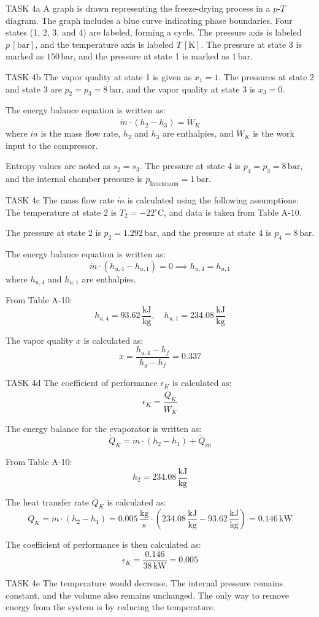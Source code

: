 TASK 4a  
A graph is drawn representing the freeze-drying process in a \( p \)-\( T \) diagram. The graph includes a blue curve indicating phase boundaries. Four states (1, 2, 3, and 4) are labeled, forming a cycle. The pressure axis is labeled \( p \, [\text{bar}] \), and the temperature axis is labeled \( T \, [\text{K}] \). The pressure at state 3 is marked as \( 150 \, \text{bar} \), and the pressure at state 1 is marked as \( 1 \, \text{bar} \).  

TASK 4b  
The vapor quality at state 1 is given as \( x_1 = 1 \).  
The pressures at state 2 and state 3 are \( p_2 = p_3 = 8 \, \text{bar} \), and the vapor quality at state 3 is \( x_3 = 0 \).  

The energy balance equation is written as:  
\[
\dot{m} \cdot (h_2 - h_3) = \dot{W}_K
\]  
where \( \dot{m} \) is the mass flow rate, \( h_2 \) and \( h_3 \) are enthalpies, and \( \dot{W}_K \) is the work input to the compressor.  

Entropy values are noted as \( s_2 = s_3 \).  
The pressure at state 4 is \( p_4 = p_3 = 8 \, \text{bar} \), and the internal chamber pressure is \( p_{\text{Innenraum}} = 1 \, \text{bar} \).  

TASK 4c  
The mass flow rate \( \dot{m} \) is calculated using the following assumptions:  
The temperature at state 2 is \( T_2 = -22^\circ\text{C} \), and data is taken from Table A-10.  

The pressure at state 2 is \( p_2 = 1.292 \, \text{bar} \), and the pressure at state 4 is \( p_4 = 8 \, \text{bar} \).  

The energy balance equation is written as:  
\[
\dot{m} \cdot (h_{u,4} - h_{u,1}) = 0 \implies h_{u,4} = h_{u,1}
\]  
where \( h_{u,4} \) and \( h_{u,1} \) are enthalpies.  

From Table A-10:  
\[
h_{u,4} = 93.62 \, \frac{\text{kJ}}{\text{kg}}, \quad h_{u,1} = 234.08 \, \frac{\text{kJ}}{\text{kg}}
\]  

The vapor quality \( x \) is calculated as:  
\[
x = \frac{h_{u,4} - h_f}{h_g - h_f} = 0.337
\]  

TASK 4d  
The coefficient of performance \( \epsilon_K \) is calculated as:  
\[
\epsilon_K = \frac{\dot{Q}_K}{\dot{W}_K}
\]  

The energy balance for the evaporator is written as:  
\[
\dot{Q}_K = \dot{m} \cdot (h_2 - h_1) + \dot{Q}_{\text{zu}}
\]  

From Table A-10:  
\[
h_2 = 234.08 \, \frac{\text{kJ}}{\text{kg}}
\]  

The heat transfer rate \( \dot{Q}_K \) is calculated as:  
\[
\dot{Q}_K = \dot{m} \cdot (h_2 - h_1) = 0.005 \, \frac{\text{kg}}{\text{s}} \cdot (234.08 \, \frac{\text{kJ}}{\text{kg}} - 93.62 \, \frac{\text{kJ}}{\text{kg}}) = 0.146 \, \text{kW}
\]  

The coefficient of performance is then calculated as:  
\[
\epsilon_K = \frac{0.146}{38 \, \text{kW}} = 0.005
\]  

TASK 4e  
The temperature would decrease. The internal pressure remains constant, and the volume also remains unchanged. The only way to remove energy from the system is by reducing the temperature.